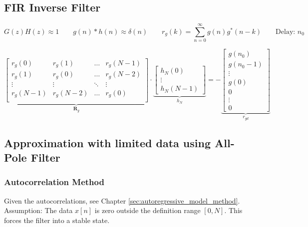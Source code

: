 \subsection{FIR Inverse Filter }
$$G(z)H(z) \approx 1\qquad g(n)*h(n) \approx \delta(n) \qquad r_g(k) = \sum\limits_{n=0}^\infty g(n)g^*(n-k) \qquad \text{Delay: } n_0$$

		$$
		\underbrace{\begin{bmatrix}
    		r_g(0) & r_g(1) & \hdots & r_g(N-1) \\
    		r_g(1) & r_g(0) & \hdots & r_g(N-2) \\
    		\vdots & \vdots & \ddots & \vdots \\
    		r_g(N-1) & r_g(N-2) & \hdots & r_g(0) \\
		\end{bmatrix}  }_{\bm R_g} \cdot
		\underbrace{\begin{bmatrix}
    		h_N(0) \\
    		\vdots \\
    		h_N(N-1)
		\end{bmatrix}  }_{h_N}= -\underbrace{\begin{bmatrix}
    		g(n_0) \\
    		g(n_0 - 1)	 \\
    		\vdots \\
    		g(0)\\
    		0\\
    		\vdots \\
    		0
		\end{bmatrix}  }_{r_{gd}}$$


		\subsection{Approximation with limited data using All-Pole Filter}
		\subsubsection{Autocorrelation Method }
		Given the autocorrelations, see Chapter \ref{sec:autoregressive_model_method}.\\
		Assumption: The data $x[n]$ is zero outside the definition range $[0,N]$. This forces the filter into a stable state.
		\renewcommand{\arraystretch}{1.0}

